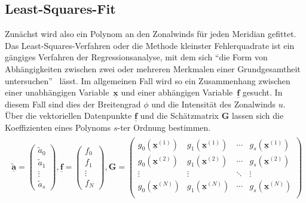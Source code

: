 \subsection{Least-Squares-Fit}
Zunächst wird also ein Polynom an den Zonalwinds für jeden Meridian gefittet. Das Least-Squares-Verfahren oder die Methode kleinster Fehlerquadrate ist ein gängiges Verfahren der Regressionsanalyse, mit dem sich \enquote{die Form von Abhängigkeiten zwischen zwei  oder mehreren Merkmalen einer Grundgesamtheit untersuchen}~\citep{bronstein-2006} lässt. Im allgemeinen Fall wird so ein Zusammenhang zwischen einer unabhängigen Variable~$\underline{\boldsymbol{x}}$ und einer abhängigen Variable~$\underline{\boldsymbol{f}}$ gesucht. In diesem Fall sind dies der Breitengrad $\phi$ und die Intensität des Zonalwinds $u$. Über die vektoriellen Datenpunkte $\underline{\boldsymbol{f}}$ und die Schätzmatrix $\boldsymbol{G}$ lassen sich die Koeffizienten eines Polynoms $s$-ter Ordnung bestimmen.  
\begin{align}
\begin{split}
\underline{\boldsymbol{\tilde{a}}} = 
\begin{pmatrix}
  \tilde{a}_0 \\
  \tilde{a}_1 \\
  \vdots \\
  \tilde{a}_s
\end{pmatrix},
\underline{\boldsymbol{f}} = 
\begin{pmatrix}
  f_0 \\
  f_1 \\
  \vdots \\
  f_N
\end{pmatrix},
\boldsymbol{G} = 
 \begin{pmatrix}
  g_{0} \left( \underline{\boldsymbol{x}}^{\left( 1 \right)} \right) & g_{1} \left( \underline{\boldsymbol{x}}^{\left( 1 \right)} \right) & \cdots & g_{s} \left( \underline{\boldsymbol{x}}^{\left( 1 \right)} \right) \\
  g_{0} \left( \underline{\boldsymbol{x}}^{\left( 2 \right)} \right) & g_{1} \left( \underline{\boldsymbol{x}}^{\left( 2 \right)} \right) & \cdots & g_{s} \left( \underline{\boldsymbol{x}}^{\left( 2 \right)} \right) \\
  \vdots  & \vdots  & \ddots & \vdots  \\
  g_{0} \left( \underline{\boldsymbol{x}}^{\left( N \right)} \right) & g_{1} \left( \underline{\boldsymbol{x}}^{\left( N \right)} \right) & \cdots & g_{s} \left( \underline{\boldsymbol{x}}^{\left( N \right)} \right) \\
 \end{pmatrix}
\end{split}
\end{align}

